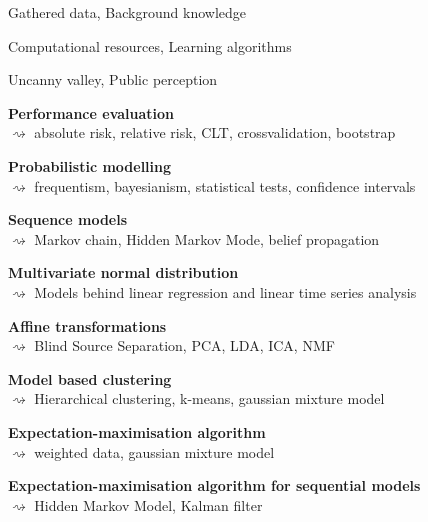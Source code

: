 \documentclass[landscape,footrule]{foils}
\begin{document}
\titlefoil


\begin{triangles}
\item Gathered data,  Background knowledge
\item Computational resources, Learning algorithms
\item Uncanny valley, Public perception
\end{triangles}
\enlargethispage{1cm}


\enlargethispage{1cm}

\enlargethispage{1cm}
\begin{small}
\begin{triangles}
\item \textbf{Performance evaluation}\\ $\rightsquigarrow$ absolute risk, relative risk, CLT, crossvalidation, bootstrap 
\item \textbf{Probabilistic modelling}\\ $\rightsquigarrow$ 
frequentism, bayesianism, statistical tests, confidence intervals 
\item \textbf{Sequence models}\\ $\rightsquigarrow$ 
Markov chain, Hidden Markov Mode, belief propagation 
\item \textbf{Multivariate normal distribution}\\ $\rightsquigarrow$
Models behind linear regression and linear time series analysis   
\item \textbf{Affine transformations}\\ $\rightsquigarrow$
Blind Source Separation, PCA, LDA, ICA, NMF   
\item \textbf{Model based clustering}\\ $\rightsquigarrow$
Hierarchical clustering, k-means, gaussian mixture model  
\item \textbf{Expectation-maximisation algorithm}\\ $\rightsquigarrow$
weighted data, gaussian mixture model
\item \textbf{Expectation-maximisation algorithm for sequential models}\\ $\rightsquigarrow$
Hidden Markov Model, Kalman filter
\end{triangles}
\end{small}
\end{document}

